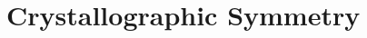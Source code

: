 %




\renewcommand{\chaptergraphicspath}{src/Symmetry/eps/}

\chapterimage{\noheaderimage}
\renewcommand{\chabbr}{CRYSYM}

\chapter{Crystallographic Symmetry\label{chap:Symmetry}}


\newcommand{\mbmi}[1]{$\mathbf{\mathit{#1}}$}

